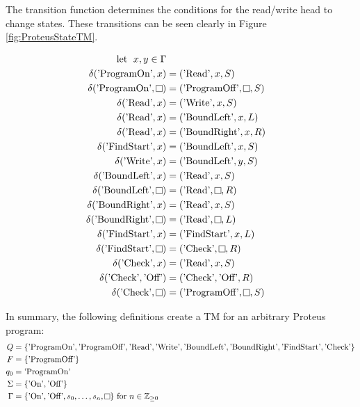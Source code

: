 The transition function determines the conditions for the read/write head to change states.
These transitions can be seen clearly in Figure \ref{fig:ProteusStateTM}.

\[
    \begin{aligned}
        \text{let \hspace{0.1cm}} x, y \in \Gamma\\
        \delta (\text{'ProgramOn'}, x) &= (\text{'Read'}, x, S)\\
        \delta (\text{'ProgramOn'}, \raisebox{0.1cm}{\fbox{}}) &= (\text{'ProgramOff'}, \raisebox{0.1cm}{\fbox{}}, S)\\
%
        \delta (\text{'Read'}, x) &= (\text{'Write'}, x, S)\\
        \delta (\text{'Read'}, x) &= (\text{'BoundLeft'}, x, L)\\
        \delta (\text{'Read'}, x) &= (\text{'BoundRight'}, x, R)\\
        \delta (\text{'FindStart'}, x) &= (\text{'BoundLeft'}, x, S)\\
%
        \delta (\text{'Write'}, x) &= (\text{'BoundLeft'}, y, S)\\
%
        \delta (\text{'BoundLeft'}, x) &= (\text{'Read'}, x, S)\\
        \delta (\text{'BoundLeft'}, \raisebox{0.1cm}{\fbox{}}) &= (\text{'Read'}, \raisebox{0.1cm}{\fbox{}}, R)\\
%
        \delta (\text{'BoundRight'}, x) &= (\text{'Read'}, x, S)\\
        \delta (\text{'BoundRight'}, \raisebox{0.1cm}{\fbox{}}) &= (\text{'Read'}, \raisebox{0.1cm}{\fbox{}}, L)\\
%
        \delta (\text{'FindStart'}, x) &= (\text{'FindStart'}, x, L)\\
        \delta (\text{'FindStart'}, \raisebox{0.1cm}{\fbox{}}) &= (\text{'Check'}, \raisebox{0.1cm}{\fbox{}}, R)\\
%
        \delta (\text{'Check'}, x) &= (\text{'Read'}, x, S)\\
        \delta (\text{'Check'}, \text{'Off'}) &= (\text{'Check'}, \text{'Off'}, R)\\
        \delta (\text{'Check'}, \raisebox{0.1cm}{\fbox{}}) &= (\text{'ProgramOff'}, \raisebox{0.1cm}{\fbox{}}, S)\\
    \end{aligned}
\]

\newpage

In summary, the following definitions create a TM for an arbitrary Proteus program:
\[
    \begin{aligned}
        Q &= \{\text{'ProgramOn'}, \text{'ProgramOff'}, \text{'Read'}, \text{'Write'}, \text{'BoundLeft'}, \text{'BoundRight'}, \text{'FindStart'}, \text{'Check'}\}\\
        F &= \{\text{'ProgramOff'}\}\\
        q_{0} &= \text{'ProgramOn'}\\
        \Sigma &= \{\text{'On'}, \text{'Off'}\}\\
        \Gamma &= \{\text{'On'}, \text{'Off'}, s_{0}, \dots, s_{n}, \raisebox{0.1cm}{\fbox{}}\} \text{ for } n \in \mathbb{Z}_{\geq \text{0}}
    \end{aligned}
\]

